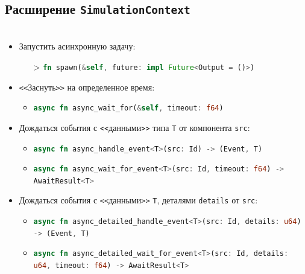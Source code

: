 \documentclass[t]{beamer}  %
\begin{document}
 \subsection{Расширение \texttt{SimulationContext}}

 \begin{frame}[fragile]
	\frametitle{\insertsection} 
	\framesubtitle{\insertsubsection}

	\begin{columns}
\begin{column}[t]{1.1\linewidth}
	\vspace{-0.5cm}
	\begin{itemize}
		\setlength{\itemsep}{0.7em} 
		\item Запустить асинхронную задачу: 
		\begin{itemize}
			\item[\footnotesize\textgreater]  \lstinline[language=Rust, basicstyle=\footnotesize\ttfamily]{fn spawn(&self, future: impl Future<Output = ()>)}
		\end{itemize}
		\item \texttt{<\textless}Заснуть\texttt{>\textgreater} на определенное время:
			\begin{itemize}
				\setlength{\itemsep}{0.5em} 
				\item[\footnotesize\textgreater]  \lstinline[language=Rust, basicstyle=\footnotesize\ttfamily]{async fn async_wait_for(&self, timeout: f64)}
			\end{itemize}
		\item Дождаться события с \texttt{<\textless}данными\texttt{>\textgreater} типа \texttt{T} от компонента \texttt{src}:
			\begin{itemize}
				\setlength{\itemsep}{0.5em} 
				\item[\footnotesize\textgreater] \lstinline[language=Rust,basicstyle=\footnotesize\ttfamily]{async fn async_handle_event<T>(src: Id) -> (Event, T)}
				\item[\footnotesize\textgreater] \lstinline[language=Rust,basicstyle=\footnotesize\ttfamily]{async fn async_wait_for_event<T>(src: Id, timeout: f64) -> AwaitResult<T>}
			\end{itemize}
		\item Дождаться события с \texttt{<\textless}данными\texttt{>\textgreater} \texttt{T}, деталями \texttt{details} от \texttt{src}:
		\begin{itemize}
			\setlength{\itemsep}{0.5em} 
			\item[\footnotesize\textgreater]\lstinline[language=Rust,basicstyle=\footnotesize\ttfamily]{async fn async_detailed_handle_event<T>(src: Id, details: u64) -> (Event, T)}
			\item[\footnotesize\textgreater]  \lstinline[language=Rust,basicstyle=\footnotesize\ttfamily]{async fn async_detailed_wait_for_event<T>(src: Id, details: u64, timeout: f64) -> AwaitResult<T>}
		\end{itemize}
	\end{itemize}
\end{column}
\end{columns}
 \end{frame}
\end{document}

